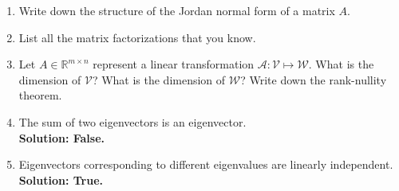 \documentclass[14pt]{report}
\begin{document}
\begin{enumerate}
\item Write down the structure of the Jordan normal form of a matrix $A$.

\item List all the matrix factorizations that you know.

\item Let $A\in\mathbb{R}^{m\times n}$ represent a linear transformation
  $\mathcal{A}:\mathcal{V}\mapsto \mathcal{W}$. What is the dimension of $\mathcal{V}$?
  What is the dimension of $\mathcal{W}$? Write down the rank-nullity theorem.

\item The sum of two eigenvectors is an eigenvector.\\
  \textbf{Solution: False.} 


\item Eigenvectors corresponding to different eigenvalues  are linearly
  independent.\\
    \textbf{Solution: True.} 

\end{enumerate}
\end{document}
